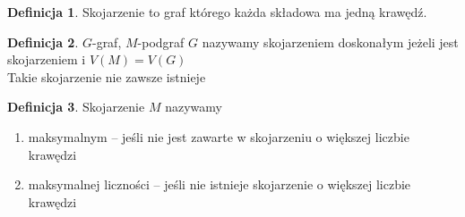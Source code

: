 \documentclass[12pt,a4paper]{article}
\theoremstyle{definition}
\newtheorem{df}{Definicja}
\begin{document}
\begin{df}
Skojarzenie to graf którego każda składowa ma jedną krawędź.
\end{df}
\begin{df}
$G$-graf, $M$-podgraf $G$ nazywamy skojarzeniem doskonałym jeżeli jest skojarzeniem i $V(M)=V(G)$\\
Takie skojarzenie nie zawsze istnieje
\end{df}
\begin{df}
Skojarzenie $M$ nazywamy 
\begin{enumerate}
	\item maksymalnym -- jeśli nie jest zawarte w skojarzeniu o większej liczbie krawędzi
	\item maksymalnej liczności -- jeśli nie istnieje skojarzenie o większej liczbie krawędzi
\end{enumerate}
\end{df}
\end{document}
